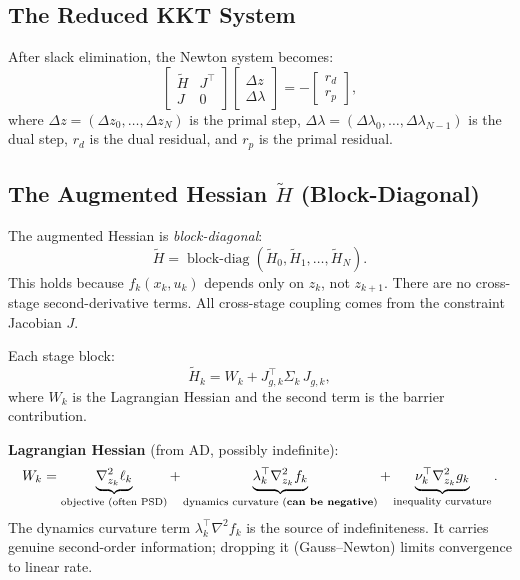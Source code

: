 \documentclass[11pt]{article}
\DeclareMathOperator{\blockdiag}{block\text{-}diag}
\begin{document}
\subsection{The Reduced KKT System}

After slack elimination, the Newton system becomes:
\begin{equation}\label{eq:kkt}
  \begin{bmatrix} \tilde{H} & J^\top \\ J & 0 \end{bmatrix}
  \begin{bmatrix} \Delta z \\ \Delta \lambda \end{bmatrix}
  = -\begin{bmatrix} r_d \\ r_p \end{bmatrix},
\end{equation}
where $\Delta z = (\Delta z_0, \dots, \Delta z_N)$ is the primal step,
$\Delta \lambda = (\Delta \lambda_0, \dots, \Delta \lambda_{N-1})$ is the dual step,
$r_d$ is the dual residual, and $r_p$ is the primal residual.


\subsection{The Augmented Hessian $\tilde{H}$ (Block-Diagonal)}

The augmented Hessian is \emph{block-diagonal}:
\begin{equation}\label{eq:Hblock}
  \tilde{H} = \blockdiag(\tilde{H}_0, \tilde{H}_1, \dots, \tilde{H}_N).
\end{equation}
This holds because $f_k(x_k, u_k)$ depends only on $z_k$, not $z_{k+1}$.
There are no cross-stage second-derivative terms. All cross-stage coupling
comes from the constraint Jacobian $J$.

Each stage block:
\begin{equation}\label{eq:Hk}
  \tilde{H}_k = W_k + J_{g,k}^\top \Sigma_k\, J_{g,k},
\end{equation}
where $W_k$ is the Lagrangian Hessian and the second term is the barrier contribution.

\textbf{Lagrangian Hessian} (from AD, possibly indefinite):
\begin{equation}\label{eq:Wk}
  W_k = \underbrace{\nabla^2_{z_k} \ell_k}_{\text{objective (often PSD)}}
      + \underbrace{\lambda_k^\top \nabla^2_{z_k} f_k}_{\text{dynamics curvature (\textbf{can be negative})}}
      + \underbrace{\nu_k^\top \nabla^2_{z_k} g_k}_{\text{inequality curvature}}.
\end{equation}
The dynamics curvature term $\lambda_k^\top \nabla^2 f_k$ is the source of
indefiniteness. It carries genuine second-order information; dropping it
(Gauss--Newton) limits convergence to linear rate.
\end{document}
